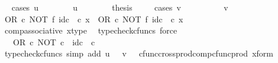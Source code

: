 \begin{isabellebody}
\ \ \isamarkupfalse%
{\isacharparenleft}{\kern0pt}cases\ {\isachardoublequoteopen}u\ {\isacharequal}{\kern0pt}\ {\isasymt}{\isachardoublequoteclose}{\isacharparenright}{\kern0pt}\isanewline
\ \ \ \ \isamarkupfalse%
\ {\isachardoublequoteopen}u\ {\isacharequal}{\kern0pt}\ {\isasymt}{\isachardoublequoteclose}\isanewline
\ \ \ \ \isamarkupfalse%
\ {\isacharquery}{\kern0pt}thesis\isanewline
\ \ \ \ \isamarkupfalse%
{\isacharparenleft}{\kern0pt}cases\ {\isachardoublequoteopen}v\ {\isacharequal}{\kern0pt}\ {\isasymt}{\isachardoublequoteclose}{\isacharparenright}{\kern0pt}\isanewline
\ \ \ \ \ \ \isamarkupfalse%
\ {\isachardoublequoteopen}v\ {\isacharequal}{\kern0pt}\ {\isasymt}{\isachardoublequoteclose}\isanewline
\ \ \ \ \ \ \isamarkupfalse%
\ {\isachardoublequoteopen}{\isacharparenleft}{\kern0pt}OR\ {\isasymcirc}\isactrlsub c\ NOT\ {\isasymtimes}\isactrlsub f\ id\isactrlsub c\ {\isasymOmega}{\isacharparenright}{\kern0pt}\ {\isasymcirc}\isactrlsub c\ x\ {\isacharequal}{\kern0pt}\ OR\ {\isasymcirc}\isactrlsub c\ {\isacharparenleft}{\kern0pt}NOT\ {\isasymtimes}\isactrlsub f\ id\isactrlsub c\ {\isasymOmega}{\isacharparenright}{\kern0pt}\ {\isasymcirc}\isactrlsub c\ x{\isachardoublequoteclose}\isanewline
\ \ \ \ \ \ \ \ \isamarkupfalse%
\ comp{\isacharunderscore}{\kern0pt}associative{}\ x{\isacharunderscore}{\kern0pt}type\ \isamarkupfalse%
\ {\isacharparenleft}{\kern0pt}typecheck{\isacharunderscore}{\kern0pt}cfuncs{\isacharcomma}{\kern0pt}\ force{\isacharparenright}{\kern0pt}\isanewline
\ \ \ \ \ \ \isamarkupfalse%
\ \isamarkupfalse%
\ {\isachardoublequoteopen}{\isachardot}{\kern0pt}{\isachardot}{\kern0pt}{\isachardot}{\kern0pt}\ {\isacharequal}{\kern0pt}\ OR\ {\isasymcirc}\isactrlsub c\ {\isasymlangle}NOT\ {\isasymcirc}\isactrlsub c\ {\isasymt}{\isacharcomma}{\kern0pt}\ id\isactrlsub c\ {\isasymOmega}\ {\isasymcirc}\isactrlsub c\ {\isasymt}{\isasymrangle}{\isachardoublequoteclose}\isanewline
\ \ \ \ \ \ \ \ \isamarkupfalse%
\ {\isacharparenleft}{\kern0pt}typecheck{\isacharunderscore}{\kern0pt}cfuncs{\isacharcomma}{\kern0pt}\ simp\ add{\isacharcolon}{\kern0pt}\ {\isacartoucheopen}u\ {\isacharequal}{\kern0pt}\ {\isasymt}{\isacartoucheclose}\ {\isacartoucheopen}v\ {\isacharequal}{\kern0pt}\ {\isasymt}{\isacartoucheclose}\ cfunc{\isacharunderscore}{\kern0pt}cross{\isacharunderscore}{\kern0pt}prod{\isacharunderscore}{\kern0pt}comp{\isacharunderscore}{\kern0pt}cfunc{\isacharunderscore}{\kern0pt}prod\ x{\isacharunderscore}{\kern0pt}form{\isacharparenright}{\kern0pt}\isanewline

\end{isabellebody}

